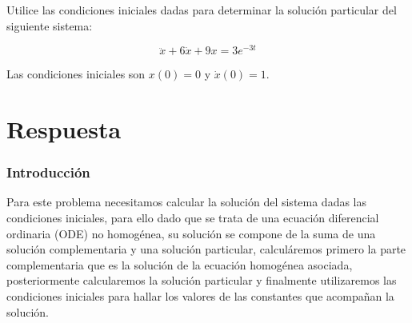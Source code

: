 \item Utilice las condiciones iniciales dadas para determinar la solución particular del siguiente sistema:
    \begin{LARGE}
        \begin{equation*}
            \ddot{x} + 6\dot{x} + 9x = 3e^{-3t}
        \end{equation*}
    \end{LARGE}
    Las condiciones iniciales son $x(0)=0$ y $\dot{x}(0)=1$.
\section*{Respuesta}
    \subsubsection*{Introducción}
        Para este problema necesitamos calcular la solución del sistema dadas las condiciones iniciales, para
        ello dado que se trata de una ecuación diferencial ordinaria (ODE) no homogénea, su solución se compone de 
        la suma de una solución complementaria y una solución particular, calculáremos primero la parte complementaria que es
        la solución de la ecuación homogénea asociada, posteriormente calcularemos la solución particular y finalmente
        utilizaremos las condiciones iniciales para hallar los valores de las constantes que acompañan la solución.
